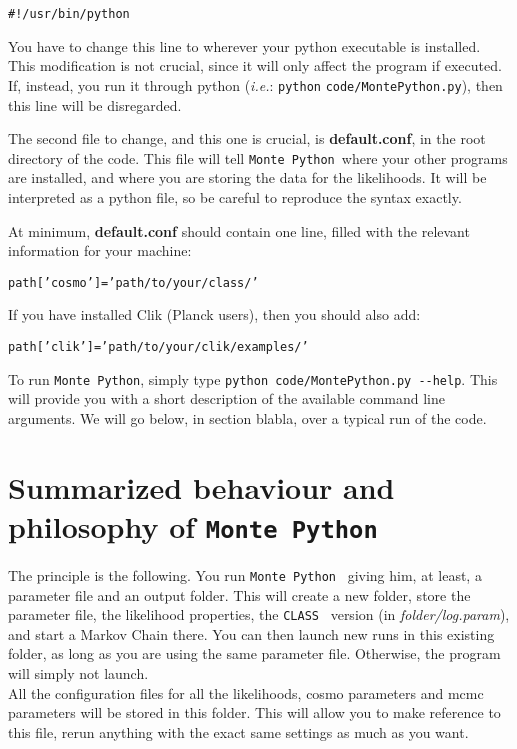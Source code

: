 \documentclass[10pt]{article}
\newcommand{\CLASS}{\texttt{CLASS}}
\newcommand{\MP}{\texttt{Monte Python}}
\begin{document}
 \begin{alltt}
    #!/usr/bin/python
 \end{alltt}

 You have to change this line to wherever your python executable is installed.
 This modification is not crucial, since it will only affect the program if
 executed. If, instead, you run it through python (\emph{i.e.}: \verb?python?
 \verb?code/MontePython.py?), then this line will be disregarded.

 The second file to change, and this one is crucial, is {\bf default.conf}, in
 the root directory of the code. This file will tell \MP\, where your
 other programs are installed, and where you are storing the data for the
 likelihoods. It will be interpreted as a python file, so be careful to
 reproduce the syntax exactly.

 At minimum, {\bf default.conf} should contain one line, filled with the
 relevant information for your machine:
 \begin{alltt}
   path['cosmo']   = 'path/to/your/class/'
 \end{alltt}
 
 If you have installed Clik (Planck users), then you should also add:
 \begin{alltt}
   path['clik']    = 'path/to/your/clik/examples/'
 \end{alltt}
 
 To run \MP, simply type \verb?python code/MontePython.py --help?. This will provide you with a short description of the available command line arguments. We will go below, in section blabla, over a typical run of the code.
 
\newpage
\section{Summarized behaviour and philosophy of \MP}

  The principle is the following. You run \MP~ giving him, at least, a
  parameter file and an output folder. This will create a new folder, store the
  parameter file, the likelihood properties, the \CLASS~ version (in
  \emph{folder/log.param}), and start a Markov Chain there.  You can then
  launch new runs in this existing folder, as long as you are using the same
  parameter file. Otherwise, the program will simply not launch.\\

  All the configuration files for all the likelihoods, cosmo parameters and
  mcmc parameters will be stored in this folder. This will allow you to make
  reference to this file, rerun anything with the exact same settings as much
  as you want.\\
\end{document}
